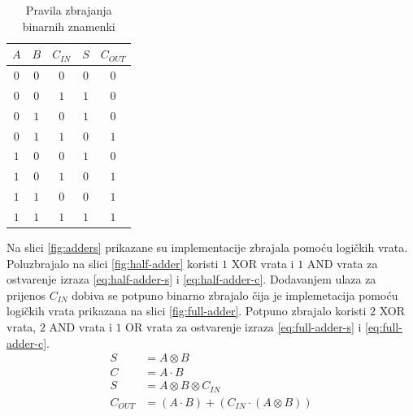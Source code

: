 \documentclass[times, utf8, diplomski]{fer}
\begin{document}
\begin{table}
	\centering
	\caption{Pravila zbrajanja binarnih znamenki}
	\label{tab:binary-addition}
	\begin{tabular}{|ccc|c|c|}
		\hline
		$A$ & $B$ & $C_{IN}$ 	& $S$ & $C_{OUT}$	\\
		\hline
		$0$ & $0$ & $0$			& $0$ & $0$			\\
		$0$ & $0$ & $1$			& $1$ & $0$			\\
		$0$ & $1$ & $0$			& $1$ & $0$			\\
		$0$ & $1$ & $1$			& $0$ & $1$			\\
		$1$ & $0$ & $0$			& $1$ & $0$			\\
		$1$ & $0$ & $1$			& $0$ & $1$			\\
		$1$ & $1$ & $0$			& $0$ & $1$			\\
		$1$ & $1$ & $1$			& $1$ & $1$			\\
		\hline
	\end{tabular}
\end{table}

Na slici \ref{fig:adders} prikazane su implementacije zbrajala pomoću logičkih vrata. Poluzbrajalo na slici \ref{fig:half-adder} koristi $1$ XOR vrata i $1$ AND vrata za ostvarenje izraza \ref{eq:half-adder-s} i \ref{eq:half-adder-c}. Dodavanjem ulaza za prijenos $C_{IN}$ dobiva se potpuno binarno zbrajalo čija  je implemetacija pomoću logičkih vrata prikazana na slici \ref{fig:full-adder}. Potpuno zbrajalo koristi $2$ XOR vrata, $2$ AND vrata i $1$ OR vrata za ostvarenje izraza \ref{eq:full-adder-s} i \ref{eq:full-adder-c}.
%
\begin{align}
	\label{eq:half-adder-s}
	S &= A \otimes B \\
	\label{eq:half-adder-c}
	C &= A \cdot B \\
	\label{eq:full-adder-s}
	S &= A \otimes B \otimes C_{IN} \\
	\label{eq:full-adder-c}
	C_{OUT} &= (A \cdot B) + (C_{IN} \cdot (A \otimes B))
\end{align}
\end{document}

